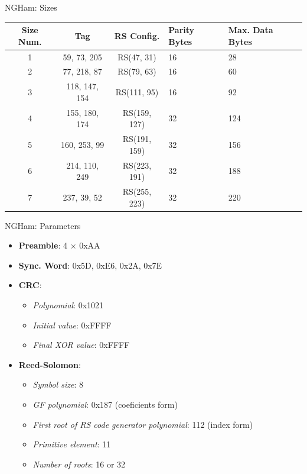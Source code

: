 \begin{frame}{NGHam: Sizes}

    \begin{table}[!htb]\small
    \centering
    \label{tab:ngham-sizes}
    \begin{tabular}{cccC{1.3cm}C{1.8cm}}
        \toprule[1.5pt]
        \textbf{Size Num.} & \textbf{Tag} & \textbf{RS Config.} & \textbf{Parity Bytes} & \textbf{Max. Data Bytes} \\
         & 59, 73, 205   & RS(47, 31)   & 16 & 28 \\
        2 & 77, 218, 87   & RS(79, 63)   & 16 & 60 \\
        3 & 118, 147, 154 & RS(111, 95)  & 16 & 92 \\
        4 & 155, 180, 174 & RS(159, 127) & 32 & 124 \\
        5 & 160, 253, 99  & RS(191, 159) & 32 & 156 \\
        6 & 214, 110, 249 & RS(223, 191) & 32 & 188 \\
        7 & 237, 39, 52   & RS(255, 223) & 32 & 220 \\
        \bottomrule[1.5pt]
    \end{tabular}

\end{table}

\end{frame}

\begin{frame}{NGHam: Parameters}

    \begin{itemize}
        \item \textbf{Preamble}: 4 $\times$ 0xAA
        \item \textbf{Sync. Word}: 0x5D, 0xE6, 0x2A, 0x7E
        \item \textbf{CRC}:
        \begin{itemize}
            \item \textit{Polynomial}: 0x1021
            \item \textit{Initial value}: 0xFFFF
            \item \textit{Final XOR value}: 0xFFFF
        \end{itemize}
        \item \textbf{Reed-Solomon}:
        \begin{itemize}
            \item \textit{Symbol size}: 8
            \item \textit{GF polynomial}: 0x187 (coeficients form)
            \item \textit{First root of RS code generator polynomial}: 112 (index form)
            \item \textit{Primitive element}: 11
            \item \textit{Number of roots}: 16 or 32
        \end{itemize}
    \end{itemize}

\end{frame}

